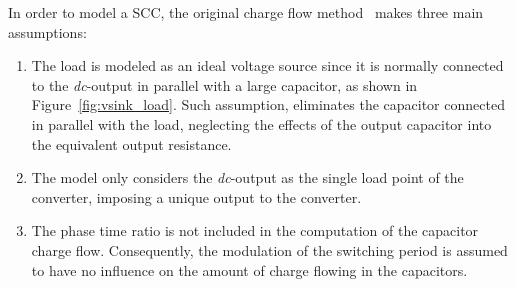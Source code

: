 In order to model a SCC, the original charge flow method~\cite{95Makowski} makes three main assumptions:
\begin{enumerate}
  \item The load is modeled as an ideal voltage source since it is normally connected to the \emph{dc}-output in parallel with a large capacitor, as shown in Figure~\ref{fig:vsink_load}. Such assumption, eliminates the capacitor connected in parallel with the load, neglecting the effects of the output capacitor into the equivalent output resistance.

  \item The model only considers the \emph{dc}-output as the single load point of the converter, imposing a unique output to the converter.

  \item The phase time ratio is not included in the computation of the capacitor charge flow. Consequently, the modulation of the switching period is assumed to have no influence on the amount of charge flowing in the capacitors.
\end{enumerate}

